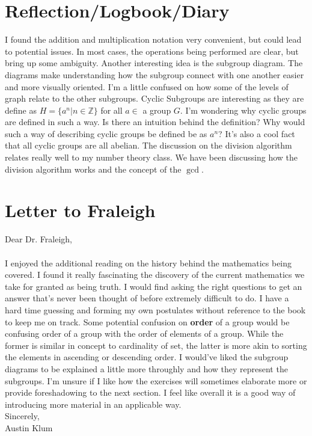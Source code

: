 \documentclass[11pt]{article}
\theoremstyle{plain}
\theoremstyle{definition}
\newcommand{\Z}{\mathbb{Z}}
\begin{document}
\section{Reflection/Logbook/Diary}
I found the addition and multiplication notation very convenient, but could lead to potential issues. In most cases, the operations being performed are clear, but bring up some ambiguity. Another interesting idea is the subgroup diagram. The diagrams make understanding how the subgroup connect with one another easier and more visually oriented. I'm a little confused on how some of the levels of graph relate to the other subgroups. Cyclic Subgroups are interesting as they are define as $ H = \{a^n|n\in\Z\} $ for all $ a\in $ a group $ G $. I'm wondering why cyclic groups are defined in such a way. Is there an intuition behind the definition? Why would such a way of describing cyclic groups be defined be as $ a^n $? It's also a cool fact that all cyclic groups are all abelian. The discussion on the division algorithm relates really well to my number theory class. We have been discussing how the division algorithm works and the concept of the $ \gcd $. 

\section{Letter to Fraleigh}
Dear Dr. Fraleigh,\\
\\
I enjoyed the additional reading on the history behind the mathematics being covered. I found it really fascinating the discovery of the current mathematics we take for granted as being truth. I would find asking the right questions to get an answer that's never been thought of before extremely difficult to do. I have a hard time guessing and forming my own postulates without reference to the book to keep me on track. Some potential confusion on \textbf{order} of a group would be confusing order of a group with the order of elements of a group. While the former is similar in concept to cardinality of set, the latter is more akin to sorting the elements in ascending or descending order. I would've liked the subgroup diagrams to be explained a little more throughly and how they represent the subgroups. I'm unsure if I like how the exercises will sometimes elaborate more or provide foreshadowing to the next section. I feel like overall it is a good way of introducing more material in an applicable way.
\\
Sincerely,\\
Austin Klum
\end{document}

